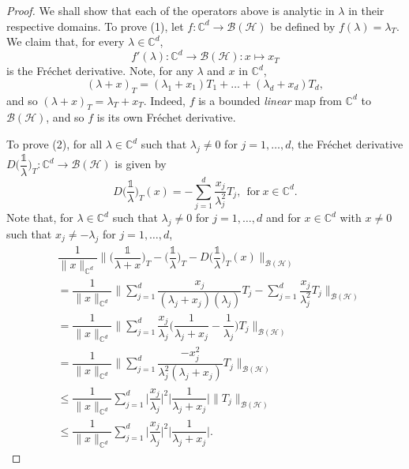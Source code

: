 \documentclass[11pt, reqno]{amsart}
\newcommand\1{\boldsymbol {1}}
\numberwithin{equation}{section}
\begin{document}
\begin{proof}
We shall show that each of the operators above is analytic  in $\lambda$ in  their respective domains. To prove (1), let $f:\mathbb{C}^{d}\rightarrow\mathcal{B(H)}$ be defined by $f(\lambda) = \lambda_{T}$. We claim that, for every $\lambda\in\mathbb{C}^{d}$,
$$f'(\lambda):\mathbb{C}^{d}\rightarrow\mathcal{B(H)} : x\mapsto x_{T}$$
is the Fr\'{e}chet derivative. Note, for any $\lambda$ and $x$ in $\mathbb{C}^{d}$, 
$$(\lambda+x)_{T}=(\lambda_{1}+x_{1})T_{1}+\hdots+(\lambda_{d}+x_{d})T_{d},$$
and so $(\lambda+x)_{T}=\lambda_{T}+x_{T}.$ Indeed, $f$ is a bounded {\em linear} map from $\mathbb{C}^{d}$ to $\mathcal{B}(\mathcal{H})$, and so $f$ is its own Fr\'{e}chet derivative.

To prove (2), for all $\lambda\in\mathbb{C}^{d}$ such that $\lambda_{j}\neq 0$ for $j=1,\hdots,d$, the Fr\'{e}chet derivative $D\bigg(\dfrac{\mathds{1}}{\lambda}\bigg)_{T}:\mathbb{C}^{d}\rightarrow \mathcal{B(H)}$ is given by
$$D\bigg(\dfrac{\mathds{1}}{\lambda}\bigg)_{T}(x) = -\sum_{j=1}^{d}\dfrac{x_{j}}{\lambda_{j}^{2}}T_{j},~~\text{for}~x\in\mathbb{C}^{d}.$$
Note that, for $\lambda\in\mathbb{C}^{d}$ such that $\lambda_{j}\neq 0$ for $j=1,\hdots,d$ and for $x\in\mathbb{C}^{d}$ with $x\neq 0$ such that $x_{j}\neq -\lambda_{j}$ for $j=1,\hdots,d$,
\begin{align}
    &\dfrac{1}{\|x\|_{\mathbb{C}^{d}}}\bigg\|\bigg(\dfrac{\mathds{1}}{\lambda+x}\bigg)_{T}-\bigg(\dfrac{\mathds{1}}{\lambda}\bigg)_{T}-D\bigg(\dfrac{\mathds{1}}{\lambda}\bigg)_{T}(x)\bigg\|_{\mathcal{B(H)}}\nonumber \\
    &= \dfrac{1}{\|x\|_{\mathbb{C}^{d}}}\bigg\|\sum_{j=1}^{d}\dfrac{x_{j}}{(\lambda_{j}+x_{j})(\lambda_{j})}T_{j}-\sum_{j=1}^{d}\dfrac{x_{j}}{\lambda_{j}^{2}}T_{j}\bigg\|_{\mathcal{B(H)}}\nonumber\\
    &=\dfrac{1}{\|x\|_{\mathbb{C}^{d}}}\bigg\|\sum_{j=1}^{d}\dfrac{x_{j}}{\lambda_{j}}\bigg(\dfrac{1}{\lambda_{j}+x_{j}}-\dfrac{1}{\lambda_{j}}\bigg)T_{j}\bigg\|_{\mathcal{B(H)}}\nonumber\\
    &=\dfrac{1}{\|x\|_{\mathbb{C}^{d}}}\bigg\|\sum_{j=1}^{d}\dfrac{-x_{j}^{2}}{\lambda_{j}^{2}(\lambda_{j}+x_{j})}T_{j}\bigg\|_{\mathcal{B(H)}}\nonumber\\
    &\leq \dfrac{1}{\|x\|_{\mathbb{C}^{d}}}\sum_{j=1}^{d}\bigg\lvert\dfrac{x_{j}}{\lambda_{j}}\bigg\rvert^{2}\bigg\lvert\dfrac{1}{\lambda_{j}+x_{j}}\bigg\rvert \|T_{j}\|_{\mathcal{B(H)}}\nonumber\\
    &\leq \dfrac{1}{\|x\|_{\mathbb{C}^{d}}}\sum_{j=1}^{d}\bigg\lvert\dfrac{x_{j}}{\lambda_{j}}\bigg\rvert^{2}\bigg\lvert\dfrac{1}{\lambda_{j}+x_{j}}\bigg\rvert.\label{hellothere}

\end{align}
\end{proof}
\end{document}
